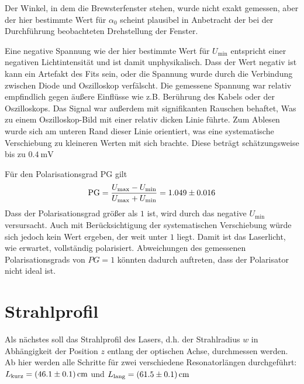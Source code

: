 \documentclass{article}
\newcommand{\mr}{\mathrm}
\begin{document}
Der Winkel, in dem die Brewsterfenster stehen, wurde nicht exakt gemessen,
aber der hier bestimmte Wert für $\alpha_0$ scheint plausibel in Anbetracht der
bei der Durchführung beobachteten Drehstellung der Fenster.

Eine negative Spannung wie der hier bestimmte Wert für $U_\mr{min}$ entspricht einer negativen
Lichtintensität und ist damit unphysikalisch. Dass der Wert negativ ist kann ein Artefakt des Fits sein,
oder die Spannung wurde durch die Verbindung zwischen Diode und Oszilloskop verfälscht. Die gemessene
Spannung war relativ empfindlich gegen äußere Einflüsse wie z.B. Berührung des Kabels oder der Oszilloskops.
Das Signal war außerdem mit signifikanten Rauschen behaftet, Was zu einem Oszilloskop-Bild mit einer relativ
dicken Linie führte. Zum Ablesen wurde sich am unteren Rand dieser Linie orientiert,
was eine systematische Verschiebung zu kleineren Werten mit sich brachte. Diese beträgt schätzungsweise bis zu $\SI{0.4}{\mV}$


Für den Polarisationsgrad PG gilt 
\begin{equation}
  \mr{PG} = \frac{U_\mr{max} - U_\mr{min}}{U_\mr{max} + U_\mr{min}} = \num{1.049\pm0.016}
\end{equation}
Dass der Polarisationsgrad größer als $1$ ist, wird durch das negative $U_\mr{min}$ versursacht.
Auch mit Berücksichtigung der systematischen Verschiebung würde sich jedoch kein Wert ergeben,
der weit unter $1$ liegt. Damit ist das Laserlicht, wie erwartet, vollständig polarisiert.
Abweichungen des gemessenen Polarisationsgrads von $PG=1$ könnten dadurch auftreten, dass der Polarisator nicht ideal ist.


\section{Strahlprofil}
Als nächstes soll das Strahlprofil des Lasers, d.h. der Strahlradius $w$ in Abhängigkeit der Position $z$ 
entlang der optischen Achse, durchmessen werden. Ab hier werden alle Schritte für zwei verschiedene Resonatorlängen durchgeführt:
$L_\mr{kurz} = \SI{46.1\pm0.1}{\cm}$ und $L_\mr{lang} = \SI{61.5\pm0.1}{\cm}$
\end{document}
